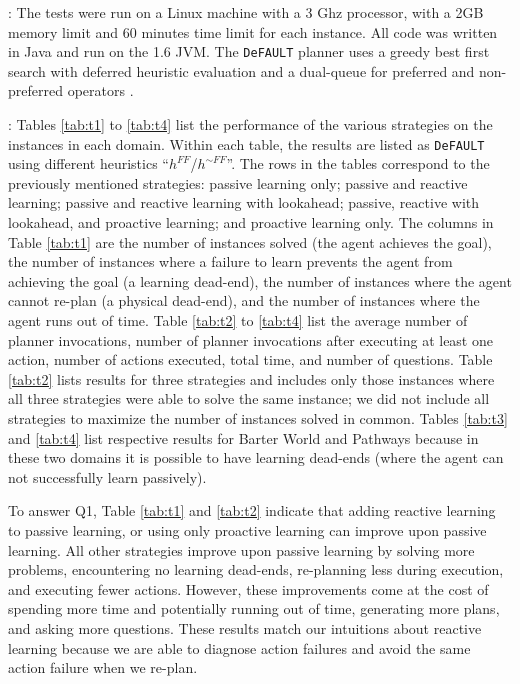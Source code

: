 \documentclass[letterpaper]{article}
\def\und#1{\noindent{\bf #1}:}
\def\citep#1{\cite{#1}}
\def\FFRISKY{{\tt DeFAULT}}
\begin{document}
\und{Test Setup} The tests were run on a Linux machine with a 3 Ghz processor,
with a  2GB memory limit and 60 minutes time limit for each instance. All code
was written in Java and run on the 1.6 JVM. The \FFRISKY{} planner uses a greedy
best first search with deferred heuristic evaluation and a dual-queue for
preferred and non-preferred operators \citep{DBLP:journals/jair/Helmert06}. 

\und{Results} Tables \ref{tab:t1} to \ref{tab:t4} list the performance of the
various strategies on the instances in each domain.  Within each table, the
results are listed as \FFRISKY{} using different heuristics
``$h^{FF}$/$h^{\sim FF}$''.  The rows in the tables correspond to the previously
mentioned strategies: passive learning only; passive and reactive learning;
passive and reactive learning with lookahead; passive, reactive with lookahead,
and proactive learning; and proactive learning only.  The columns in Table
\ref{tab:t1} are the number of instances solved (the agent achieves the goal),
the number of instances where a failure to learn prevents the agent from
achieving the goal (a learning dead-end), the number of instances where the
agent cannot re-plan (a physical dead-end), and the number of instances where
the agent runs out of time.  Table \ref{tab:t2} to \ref{tab:t4} list the average
number of planner invocations, number of planner invocations after executing at
least one action, number of actions executed, total time, and number of
questions.  Table \ref{tab:t2} lists results for three strategies and includes
only those instances where all three strategies were able to solve the same
instance; we did not include all strategies to maximize the number of instances
solved in common.  Tables \ref{tab:t3} and \ref{tab:t4} list respective results
for Barter World and Pathways because in these two domains it is possible to
have learning dead-ends (where the agent can not successfully learn passively).



To answer Q1, Table \ref{tab:t1} and \ref{tab:t2} indicate that adding reactive
learning to passive learning, or using only proactive learning can improve upon
passive learning.  All other strategies improve upon passive learning by solving
more problems, encountering no learning dead-ends, re-planning less during
execution, and executing fewer actions.  However, these improvements come at the
cost of spending more time and potentially running out of time, generating more
plans, and asking more questions.  These results match our intuitions about
reactive learning because we are able to diagnose action failures and avoid the
same action failure when we re-plan.
\end{document}
